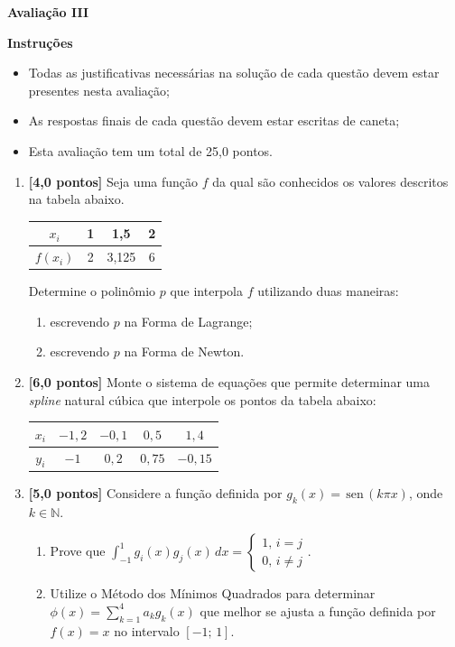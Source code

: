 \documentclass[12pt,a4paper]{article}
\newcommand{\sen}{\,\textrm{sen}\,}
\begin{document}
\begin{center}
 \textbf{Avaliação III}
\end{center}

\textbf{Instruções}
\begin{itemize}
 \item Todas as justificativas necessárias na solução de cada questão devem estar presentes nesta avaliação;
 \item As respostas finais de cada questão devem estar escritas de caneta;
 \item Esta avaliação tem um total de 25,0 pontos.
\end{itemize}

\begin{enumerate}

 \item \textbf{[4,0 pontos]} Seja uma função $f$ da qual são conhecidos os valores descritos na tabela abaixo.
  \begin{center}
   \begin{tabular}{c|c|c|c}
    $x_i$ & 1 & 1,5 & 2\\ \hline
    $f(x_i)$ & 2 & 3,125 & 6
   \end{tabular}
  \end{center}

  Determine o polinômio $p$ que interpola $f$ utilizando duas maneiras:
  \begin{enumerate}
   \item escrevendo $p$ na Forma de Lagrange;
   \item escrevendo $p$ na Forma de Newton.
  \end{enumerate}
 
 \item \textbf{[6,0 pontos]} Monte o sistema de equações que permite determinar uma \textit{spline} natural cúbica que interpole os pontos da tabela abaixo:

   \begin{center}
   \begin{tabular}{c|c|c|c|c}
      $x_i$ & $-1,2$ & $-0,1$ & $0,5$ & $1,4$ \\ \hline
      $y_i$ & $-1$ & $0,2$ & $0,75$ & $-0,15$
   \end{tabular}
   \end{center}

 \item \textbf{[5,0 pontos]} Considere a função definida por $g_k(x)=\sen(k\pi x)$, onde $k\in\mathbb{N}$.

   \begin{enumerate}
    \item Prove que $\displaystyle\int_{-1}^1 g_i(x)g_j(x)\,dx = \begin{cases}1,\,i = j \\ 0,\,i\neq j\end{cases}$.
    \item Utilize o Método dos Mínimos Quadrados para determinar $\displaystyle \phi(x) = \sum_{k=1}^4 a_kg_k(x)$ que melhor se ajusta a função definida por 
          $f(x) = x$ no intervalo $[-1;\, 1]$.
   \end{enumerate}


\end{enumerate}
\end{document}
